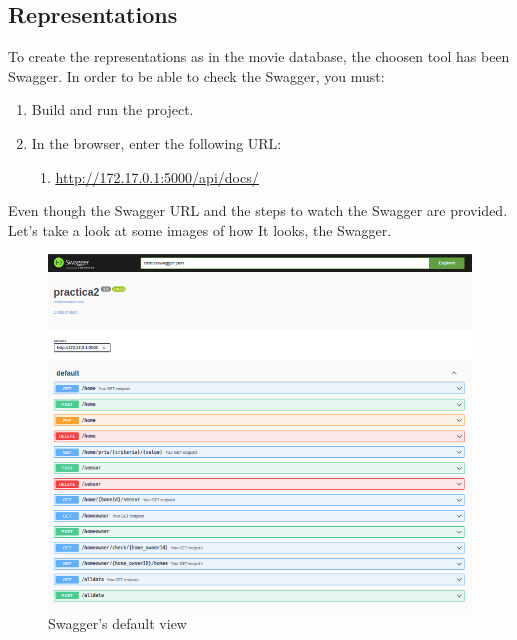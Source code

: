 \documentclass[a4paper,12pt]{article}
\begin{document}
\subsection*{Representations}
To create the representations as in the movie database, the choosen tool has been Swagger. In order to be able to check the Swagger, you must:
\begin{enumerate}
    \item Build and run the project.
    \item In the browser, enter the following URL:
    \begin{enumerate}
        \item \href{http://172.17.0.1:5000/api/docs/}{\underline{http://172.17.0.1:5000/api/docs/}}
    \end{enumerate}
\end{enumerate}
Even though the Swagger URL and the steps to watch the Swagger are provided. Let's take a look at some images of how It looks, the Swagger.
\begin{figure}[H]
    \centering
    \includegraphics[scale = 0.5]{images/Swagger default.png}
    \caption{Swagger's default view}
    \label{fig:my_label}
\end{figure}
\end{document}
